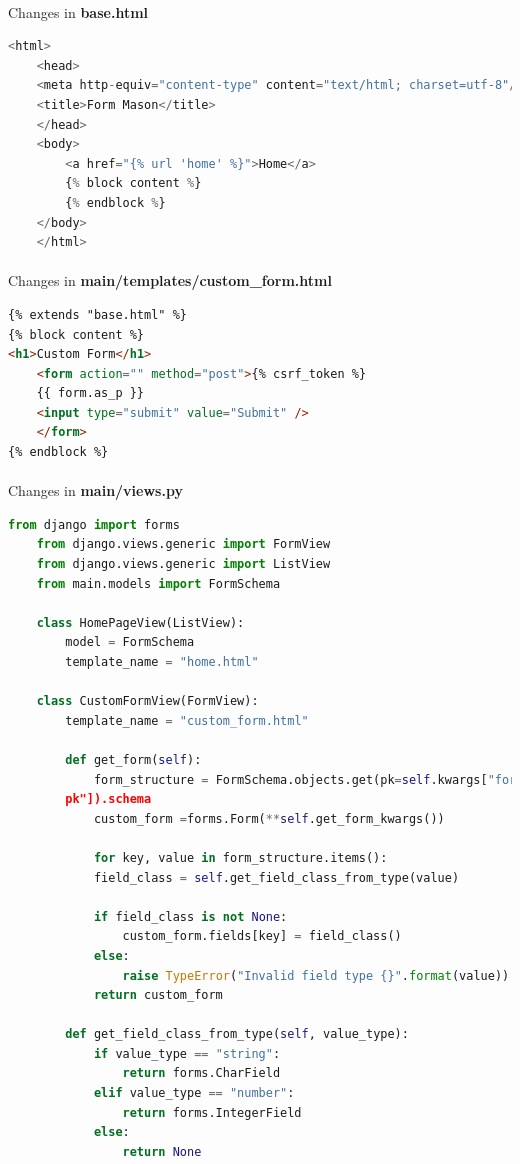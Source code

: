 \newpage
\paragraph{} Changes in \textbf{base.html}
\begin{lstlisting}[language=python,numbers=none]
	<html>
	<head>
	<meta http-equiv="content-type" content="text/html; charset=utf-8"/>
	<title>Form Mason</title>
	</head>
	<body>
		<a href="{% url 'home' %}">Home</a>
		{% block content %}
		{% endblock %}
	</body>
	</html>
\end{lstlisting}
\paragraph{}Changes in \textbf{main/templates/custom\_form.html}

\begin{lstlisting}[language=html,numbers=none]
{% extends "base.html" %}
{% block content %}
<h1>Custom Form</h1>
	<form action="" method="post">{% csrf_token %}
	{{ form.as_p }}
	<input type="submit" value="Submit" />
	</form>
{% endblock %}
\end{lstlisting}
\paragraph{}Changes in \textbf{main/views.py}

\begin{lstlisting}[language=python,numbers=none]
	from django import forms
	from django.views.generic import FormView
	from django.views.generic import ListView
	from main.models import FormSchema
	
	class HomePageView(ListView):
		model = FormSchema
		template_name = "home.html"
	
	class CustomFormView(FormView):
	    template_name = "custom_form.html"
	    
	    def get_form(self):
	    	form_structure = FormSchema.objects.get(pk=self.kwargs["form_
	    pk"]).schema
	    	custom_form =forms.Form(**self.get_form_kwargs())
	    
	    	for key, value in form_structure.items():
	    	field_class = self.get_field_class_from_type(value)
	    
	    	if field_class is not None:
	    		custom_form.fields[key] = field_class()
	   	    else:
	    		raise TypeError("Invalid field type {}".format(value))
	    	return custom_form
	    
	    def get_field_class_from_type(self, value_type):
	    	if value_type == "string":
	    		return forms.CharField
	    	elif value_type == "number":
	    		return forms.IntegerField
	    	else:
	    		return None
\end{lstlisting}
